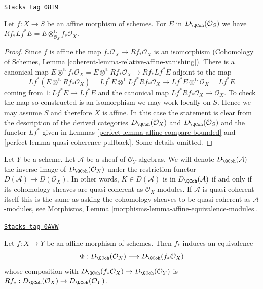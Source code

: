 \begin{lemma}
\label{perfect-lemma-affine-morphism-pull-push}
\href{https://stacks.math.columbia.edu/tag/08I9}{\texttt{Stacks tag 08I9}}

Let $f : X \to S$ be an affine morphism of schemes.
For $E$ in $D_\QCoh(\mathcal{O}_S)$ we have
$Rf_* Lf^* E = E \otimes^\mathbf{L}_{\mathcal{O}_S} f_*\mathcal{O}_X$.
\end{lemma}

\begin{proof}

Since $f$ is affine the map $f_*\mathcal{O}_X \to Rf_*\mathcal{O}_X$
is an isomorphism
(Cohomology of Schemes, Lemma \ref{coherent-lemma-relative-affine-vanishing}).
There is a canonical map $E \otimes^\mathbf{L} f_*\mathcal{O}_X =
E \otimes^\mathbf{L} Rf_*\mathcal{O}_X \to Rf_* Lf^* E$
adjoint to the map
$$
Lf^*(E \otimes^\mathbf{L} Rf_*\mathcal{O}_X) =
Lf^*E \otimes^\mathbf{L} Lf^*Rf_*\mathcal{O}_X \longrightarrow
Lf^* E \otimes^\mathbf{L} \mathcal{O}_X = Lf^* E
$$
coming from $1 : Lf^*E \to Lf^*E$ and the canonical map
$Lf^*Rf_*\mathcal{O}_X \to \mathcal{O}_X$. To check the map so constructed
is an isomorphism we may work locally on $S$. Hence we may assume
$S$ and therefore $X$ is affine. In this case the statement is clear from
the description of the derived categories
$D_\QCoh(\mathcal{O}_X)$ and
$D_\QCoh(\mathcal{O}_S)$ and the functor $Lf^*$ given in
Lemmas \ref{perfect-lemma-affine-compare-bounded} and
\ref{perfect-lemma-quasi-coherence-pullback}.
Some details omitted.
\end{proof}

Let $Y$ be a scheme. Let $\mathcal{A}$ be a sheaf of $\mathcal{O}_Y$-algebras.
We will denote $D_\QCoh(\mathcal{A})$ the inverse image of
$D_\QCoh(\mathcal{O}_X)$ under the restriction functor
$D(\mathcal{A}) \to D(\mathcal{O}_X)$. In other words, $K \in D(\mathcal{A})$
is in $D_\QCoh(\mathcal{A})$ if and only if its cohomology sheaves are
quasi-coherent as $\mathcal{O}_X$-modules. If $\mathcal{A}$ is quasi-coherent
itself this is the same as asking the cohomology sheaves to be quasi-coherent
as $\mathcal{A}$-modules, see
Morphisms, Lemma \ref{morphisms-lemma-affine-equivalence-modules}.

\begin{lemma}
\label{perfect-lemma-affine-morphism-equivalence}
\href{https://stacks.math.columbia.edu/tag/0AVW}{\texttt{Stacks tag 0AVW}}

Let $f : X \to Y$ be an affine morphism of schemes. Then $f_*$ induces
an equivalence
$$
\Phi : D_\QCoh(\mathcal{O}_X) \longrightarrow D_\QCoh(f_*\mathcal{O}_X)
$$
whose composition with $D_\QCoh(f_*\mathcal{O}_X) \to D_\QCoh(\mathcal{O}_Y)$
is $Rf_* : D_\QCoh(\mathcal{O}_X) \to D_\QCoh(\mathcal{O}_Y)$.
\end{lemma}

